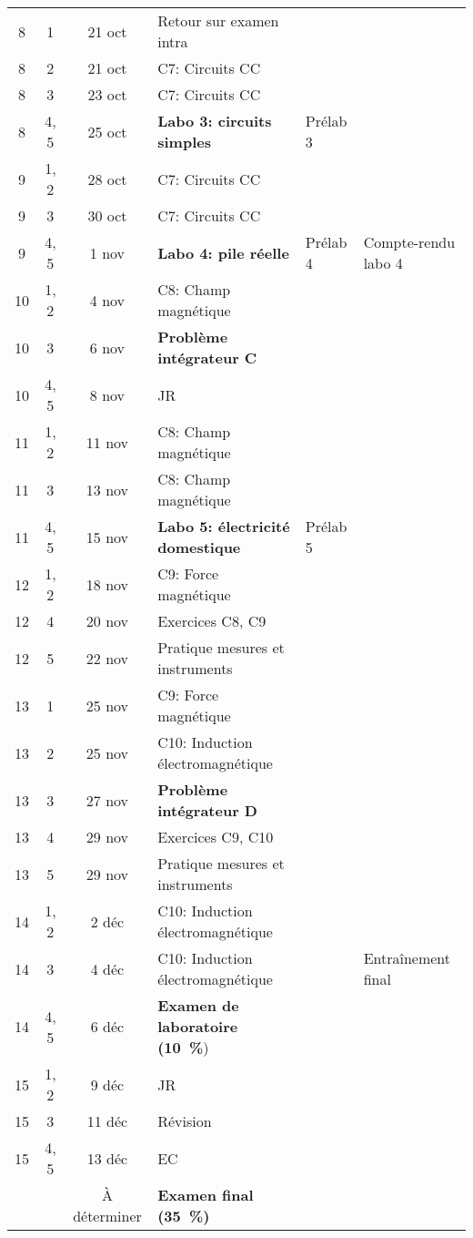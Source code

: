 \documentclass[10pt]{article}
\begin{document}
\begin{longtable}{cccp{6cm}lp{9cm}}
  8     &  1     &  21 oct   &  Retour sur examen intra  \\
  8     &  2     &  21 oct   &  C7: Circuits CC  \\
  8     &  3     &  23 oct   &  C7: Circuits CC  &   &   \\
  8     &  4, 5  &  25 oct   &  \textbf{Labo 3: circuits simples}
    &  Prélab 3  &   \\
  \midrule
  9     &  1, 2  &  28 oct   &  C7: Circuits CC  \\
  9     &  3     &  30 oct   &  C7: Circuits CC  \\
  9     &  4, 5  &  1 nov    &  \textbf{Labo 4: pile réelle}
    &  Prélab 4  &  Compte-rendu labo 4 \\
  \midrule
  10    &  1, 2  &  4 nov    &  C8: Champ magnétique  \\*
  10    &  3     &  6 nov    &  \textbf{Problème intégrateur C} &   &    \\*
  10    &  4, 5  &  8 nov    &  JR
    &    &   \\
  \midrule
  11    &  1, 2  &  11 nov   &  C8: Champ magnétique  \\
  11    &  3     &  13 nov   &  C8: Champ magnétique  \\
  11    &  4, 5  &  15 nov   &  \textbf{Labo 5: électricité domestique}
    &  Prélab 5  &    \\
  \midrule
  12    &  1, 2  &  18 nov   &  C9: Force magnétique  \\
  12    &  4     &  20 nov   &  Exercices C8, C9  &  &  \\
  12    &  5     &  22 nov   &  Pratique mesures et instruments  &  &  \\
  \midrule
  13    &  1     &  25 nov   &  C9: Force magnétique  \\
  13    &  2     &  25 nov   &  C10: Induction électromagnétique  \\
  13    &  3     &  27 nov   &  \textbf{Problème intégrateur D}  \\
  13    &  4     &  29 nov   &  Exercices C9, C10  \\
  13    &  5     &  29 nov   &  Pratique mesures et instruments  &  &  \\
  \midrule
  14    &  1, 2  &  2 déc    &  C10: Induction électromagnétique  \\
  14    &  3     &  4 déc    &  C10: Induction électromagnétique &  &  Entraînement final  \\
  14    &  4, 5  &  6 déc    &  \textbf{Examen de laboratoire (\qty{10}{\percent}})
    &    &   \\
  \midrule
  15    &  1, 2  &  9 déc    &  JR \\
  15    &  3     &  11 déc   &  Révision   \\
  15    &  4, 5  &  13 déc   &  EC
    &    &   \\
        &        & À déterminer  &  \textbf{Examen final (\qty{35}{\percent})}  \\
  \bottomrule
\end{longtable}
\end{document}
